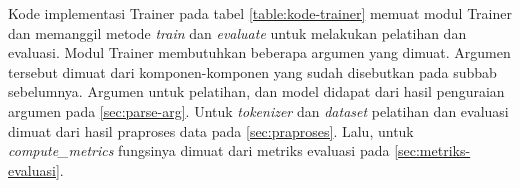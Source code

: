 Kode implementasi Trainer pada tabel \ref{table:kode-trainer} memuat modul Trainer dan memanggil metode \textit{train} dan \textit{evaluate} untuk melakukan pelatihan dan evaluasi. Modul Trainer membutuhkan beberapa argumen yang dimuat. Argumen tersebut dimuat dari komponen-komponen yang sudah disebutkan pada subbab sebelumnya. Argumen untuk pelatihan, dan model didapat dari hasil penguraian argumen pada \ref{sec:parse-arg}. Untuk \textit{tokenizer} dan \textit{dataset} pelatihan dan evaluasi dimuat dari hasil praproses data pada \ref{sec:praproses}. Lalu, untuk \textit{compute\_metrics} fungsinya dimuat dari metriks evaluasi pada \ref{sec:metriks-evaluasi}. 
